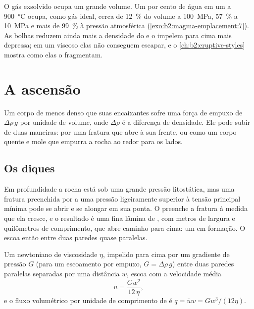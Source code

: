 O gás exsolvido ocupa um grande volume. Um por cento de água em um  a
\qty{900}{\celsius} ocupa, como gás ideal, cerca de \qty{12}{\percent} do
volume a \qty{100}{MPa}, \qty{57}{\percent} a \qty{10}{MPa} e mais de
\qty{99}{\percent} à pressão atmosférica (\cref{exo:b2:magma-emplacement:7}). As bolhas reduzem ainda mais a
densidade do  e o impelem para cima mais depressa; em um  viscoso
elas não conseguem escapar, e o \cref{ch:b2:eruptive-styles} mostra como elas o fragmentam.

\section{A ascensão}

Um corpo de  menos denso que suas encaixantes sofre uma força de empuxo de
$\Delta\rho\,g$ por unidade de volume, onde $\Delta\rho$ é a diferença de densidade. Ele
pode subir de duas maneiras: por uma fratura que abre à sua frente, ou como um corpo quente e
mole que empurra a rocha ao redor para os lados.

\subsection{Os diques}

Em profundidade a rocha está sob uma grande pressão litostática, mas uma fratura preenchida
por  a uma pressão ligeiramente superior à tensão principal mínima pode
se abrir e se alongar em sua ponta. O  preenche a fratura à medida que ela cresce, e o resultado
é uma fina lâmina de , com metros de largura e quilômetros de comprimento, que abre caminho
para cima: um  em formação. O  escoa então entre duas paredes quase
paralelas.

\begin{proposition}\label{prop:b2:magma-emplacement:poiseuille}
Um  newtoniano de viscosidade $\eta$, impelido para cima por um gradiente de pressão $G$
(para um escoamento por empuxo, $G = \Delta\rho\,g$) entre duas paredes paralelas separadas por uma distância $w$,
escoa com a velocidade média
\[
\bar u = \frac{G w^2}{12\,\eta},
\]
e o fluxo volumétrico por unidade de comprimento de  é $q = \bar u w = G w^3/(12\eta)$.
\end{proposition}

